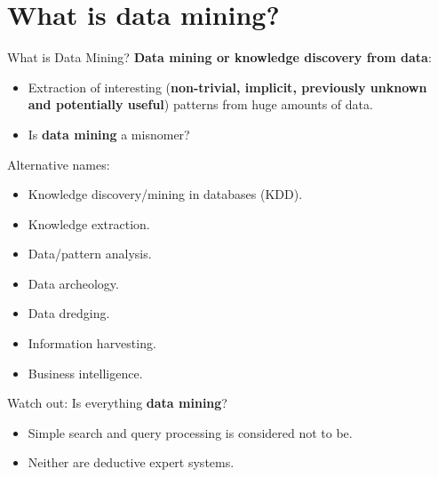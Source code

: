 \section{What is data mining?}

\begin{frame}{What is Data Mining?}
	\textbf{Data mining or knowledge discovery from data}:
	\begin{itemize}
		\item Extraction of interesting (\textbf{non-trivial, implicit, 
		previously unknown \\
			and potentially useful}) patterns from huge amounts of data.
		\item Is \textbf{data mining} a misnomer?
	\end{itemize}
	Alternative names:
	\begin{itemize}
		\item Knowledge discovery/mining in databases (KDD).
		\item Knowledge extraction.
		\item Data/pattern analysis.
		\item Data archeology.
		\item Data dredging.
		\item Information harvesting.
		\item Business intelligence.
	\end{itemize}
	Watch out: Is everything \textbf{data mining}?
	\begin{itemize}
		\item Simple search and query processing is considered not to be.
		\item Neither are deductive expert systems.
	\end{itemize}
\end{frame}

